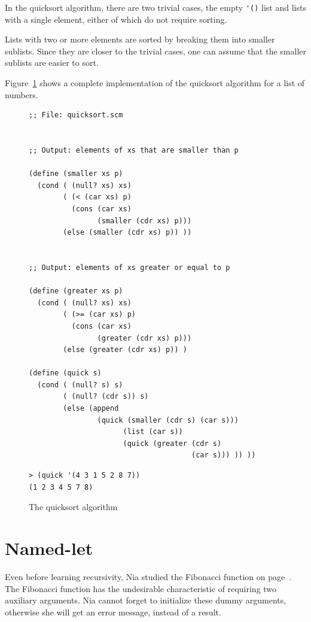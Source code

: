 \documentclass[a4paper,12pt]{book}
\newenvironment{fmpage}[1]
               {\begin{lrbox}{\fmbox}\begin{minipage}{#1}}
               {\end{minipage}\end{lrbox}\fbox{\usebox{\fmbox}}}
\begin{document}
In the quicksort algorithm,
there are two trivial cases,
the empty \verb|'()| list
and lists with a single element,
either of which
do not require sorting.

Lists with two or more elements
are sorted by breaking them into
smaller sublists. Since they are
closer to the trivial cases,
one can assume that the smaller sublists
are easier to sort.

Figure~\ref{quicksort} shows a complete
implementation of the quicksort algorithm
for a list of numbers.

\begin{figure}[!h]
\begin{fmpage}{0.9\linewidth}
\begin{verbatim}
;; File: quicksort.scm


;; Output: elements of xs that are smaller than p

(define (smaller xs p)
  (cond ( (null? xs) xs)
        ( (< (car xs) p)
          (cons (car xs)
                (smaller (cdr xs) p)))
        (else (smaller (cdr xs) p)) ))


;; Output: elements of xs greater or equal to p

(define (greater xs p)
  (cond ( (null? xs) xs)
        ( (>= (car xs) p)
          (cons (car xs)
                (greater (cdr xs) p)))
        (else (greater (cdr xs) p)) ) 

(define (quick s)
  (cond ( (null? s) s)
        ( (null? (cdr s)) s)
        (else (append 
                (quick (smaller (cdr s) (car s)))
                      (list (car s))
                      (quick (greater (cdr s)
                                      (car s))) )) ))

\end{verbatim}
\end{fmpage}

\begin{fmpage}{0.9\linewidth}
\begin{verbatim}
> (quick '(4 3 1 5 2 8 7))
(1 2 3 4 5 7 8)
\end{verbatim}
\end{fmpage}
\caption{The quicksort algorithm}
\label{quicksort}
\end{figure}

\section{Named-let}

Even before learning recursivity,
Nia studied the Fibonacci
function on page~\pageref{page:Fibonacci}.
The Fibonacci function has the
undesirable characteristic of
requiring two auxiliary arguments.
Nia cannot forget to initialize
these dummy arguments, otherwise
she will get an error message,
instead of a result. 
\end{document}
